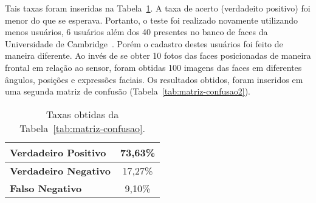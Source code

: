 	Tais taxas foram inseridas na Tabela~\ref{tab:taxas}. A taxa de acerto
	(verdadeito positivo) foi menor do que se esperava. Portanto, o teste foi
	realizado novamente utilizando menos usuários, 6 usuários além dos 40
	presentes no banco de faces da Universidade de
	Cambridge~\cite{cambridgeFaceDb}. Porém o cadastro destes usuários foi feito
	de maneira diferente. Ao invés de se obter 10 fotos das faces posicionadas de
	maneira frontal em relação ao sensor, foram obtidas 100 imagens das faces em
	diferentes ângulos, posições e expressões faciais. Os resultados obtidos, foram inseridos em uma
	segunda matriz de confusão (Tabela~\ref{tab:matriz-confusao2}).

	\begin{table}[htb]
		\begin{center}
			\caption{Taxas obtidas da Tabela~\ref{tab:matriz-confusao}.}
			\label{tab:taxas}
			\begin{tabular}{|l|c|}
				\hline \bf Verdadeiro Positivo & 73,63\% \\
				\hline \bf Verdadeiro Negativo & 17,27\% \\
				\hline \bf Falso Negativo & 9,10\% \\
				\hline
			\end{tabular}
		\end{center}
	\end{table}



				 

